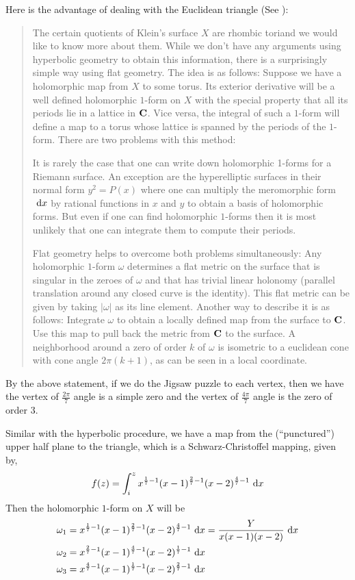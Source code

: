 Here is the advantage of dealing with the Euclidean triangle (See \cite{MR1722412}):
\begin{quote}
The certain quotients of Klein’s surface $X$ are rhombic toriand we would like to know more about them. While we don’t have any arguments using hyperbolic geometry to obtain this information, there is a surprisingly simple way using flat geometry. The idea is as follows: Suppose we have a holomorphic map from $X$ to some torus. Its exterior derivative will be a well defined holomorphic $1$-form on $X$ with the special property that all its periods lie in a lattice in $\mathbf{C}$. Vice versa, the integral of such a $1$-form will define a map to a torus whose lattice is spanned by the periods of the $1$-form. There are two
problems with this method: 

It is rarely the case that one can write down holomorphic 1-forms for a Riemann surface. An exception are the hyperelliptic surfaces in their normal form $y^2 = P(x)$ where one can multiply the meromorphic form $~\mathrm{d} x$ by rational functions in $x$ and $y$ to obtain a basis of holomorphic forms. But even if one can find holomorphic $1$-forms then it is most unlikely that one can integrate them to compute their periods.

Flat geometry helps to overcome both problems simultaneously: Any holomorphic $1$-form $\omega$ determines a flat metric on the surface that is singular in the zeroes of $\omega$ and that has trivial linear holonomy (parallel translation around any closed curve is the identity). This flat metric can be given by taking $|\omega|$ as its line element. Another way to describe it is as follows: Integrate $\omega$ to obtain a locally defined map from the surface to $\mathbf{C}$. Use this map to pull back the metric from $\mathbf{C}$ to the surface. A neighborhood around a zero of order $k$ of $\omega$ is isometric to a euclidean cone with cone angle $2\pi(k + 1)$, as can be seen in a local coordinate.
    
\end{quote}

By the above statement, if we do the Jigsaw puzzle to each vertex, then we have the vertex of $\frac{2\pi}{7}$ angle is a simple zero and the vertex of $\frac{4\pi}{7}$ angle is the zero of order $3$.

Similar with the hyperbolic procedure, we have a map from the (``punctured'') upper half plane to the triangle, which is a Schwarz-Christoffel mapping, given by,
\[f(z)=\int_{i}^{z} x^{\frac{1}{7}-1} (x-1)^{\frac{2}{7}-1} (x-2)^{\frac{4}{7}-1}~\mathrm{d} x\]
Then the holomorphic $1$-form on $X$ will be 
\[\begin{aligned}
\omega_1 &= x^{\frac{1}{7}-1} (x-1)^{\frac{2}{7}-1} (x-2)^{\frac{4}{7}-1}~\mathrm{d} x = \frac{Y}{x(x-1)(x-2)}~\mathrm{d} x \\
\omega_2 &= x^{\frac{2}{7}-1} (x-1)^{\frac{4}{7}-1} (x-2)^{\frac{1}{7}-1}~\mathrm{d} x \\
\omega_3 &= x^{\frac{4}{7}-1} (x-1)^{\frac{1}{7}-1} (x-2)^{\frac{2}{7}-1}~\mathrm{d} x \end{aligned}\]

